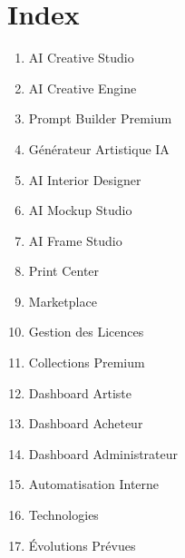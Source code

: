 \documentclass[12pt,a4paper,oneside]{book}
\begin{document}
\appendix

\chapter{Index}
\begin{enumerate}
\item AI Creative Studio
\item AI Creative Engine
\item Prompt Builder Premium
\item Générateur Artistique IA
\item AI Interior Designer
\item AI Mockup Studio
\item AI Frame Studio
\item Print Center
\item Marketplace
\item Gestion des Licences
\item Collections Premium
\item Dashboard Artiste
\item Dashboard Acheteur
\item Dashboard Administrateur
\item Automatisation Interne
\item Technologies
\item Évolutions Prévues
\end{enumerate}
\end{document}
